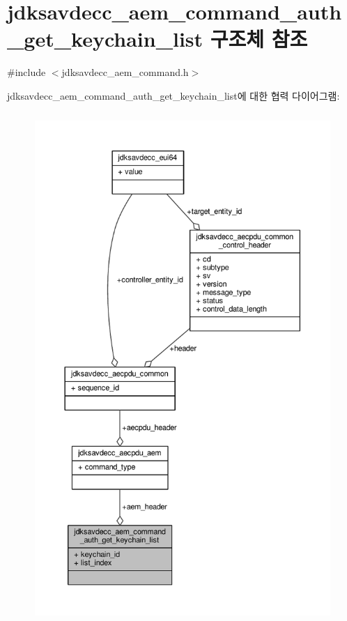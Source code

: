 \hypertarget{structjdksavdecc__aem__command__auth__get__keychain__list}{}\section{jdksavdecc\+\_\+aem\+\_\+command\+\_\+auth\+\_\+get\+\_\+keychain\+\_\+list 구조체 참조}
\label{structjdksavdecc__aem__command__auth__get__keychain__list}


{\ttfamily \#include $<$jdksavdecc\+\_\+aem\+\_\+command.\+h$>$}



jdksavdecc\+\_\+aem\+\_\+command\+\_\+auth\+\_\+get\+\_\+keychain\+\_\+list에 대한 협력 다이어그램\+:
\nopagebreak
\begin{figure}[H]
\begin{center}
\leavevmode
\includegraphics[height=550pt]{structjdksavdecc__aem__command__auth__get__keychain__list__coll__graph}
\end{center}
\end{figure}
